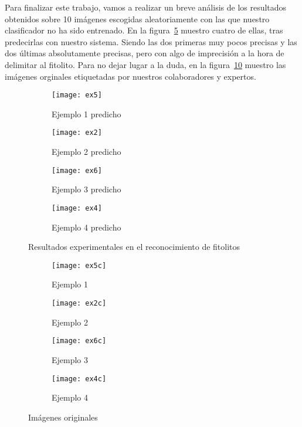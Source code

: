 Para finalizar este trabajo, vamos a realizar un breve análisis de los resultados obtenidos sobre 10 imágenes escogidas aleatoriamente con las que nuestro clasificador no ha sido entrenado. En la figura~\ref{fig:5.17} muestro cuatro de ellas, tras predecirlas con nuestro sistema. Siendo las dos primeras muy pocos precisas y las dos últimas absolutamente precisas, pero con algo de imprecisión a la hora de delimitar al fitolito. Para no dejar lugar a la duda, en la figura~\ref{fig:5.18} muestro las imágenes orginales etiquetadas por nuestros colaboradores y expertos.

\begin{figure}
	\centering
	\begin{subfigure}[b]{0.45\textwidth}
        \texttt{[image: ex5]}
        \caption{Ejemplo 1 predicho}
        \label{subfig:fej1}
    \end{subfigure}
    \begin{subfigure}[b]{0.45\textwidth}
        \texttt{[image: ex2]}
        \caption{Ejemplo 2 predicho}
        \label{subfig:fej2}
    \end{subfigure}
    \begin{subfigure}[b]{0.45\textwidth}
        \texttt{[image: ex6]}
        \caption{Ejemplo 3 predicho}
        \label{subfig:fe3}
    \end{subfigure}
    \begin{subfigure}[b]{0.45\textwidth}
        \texttt{[image: ex4]}
        \caption{Ejemplo 4 predicho}
        \label{subfig:fe4}
    \end{subfigure}
        \caption{Resultados experimentales en el reconocimiento de fitolitos}
	\label{fig:5.17}
\end{figure}

\begin{figure}
	\centering
	\begin{subfigure}[b]{0.45\textwidth}
        \texttt{[image: ex5c]}
        \caption{Ejemplo 1}
        \label{subfig:fej1c}
    \end{subfigure}
    \begin{subfigure}[b]{0.45\textwidth}
        \texttt{[image: ex2c]}
        \caption{Ejemplo 2}
        \label{subfig:fej2c}
    \end{subfigure}
    \begin{subfigure}[b]{0.45\textwidth}
        \texttt{[image: ex6c]}
        \caption{Ejemplo 3}
        \label{subfig:fe3c}
    \end{subfigure}
    \begin{subfigure}[b]{0.45\textwidth}
        \texttt{[image: ex4c]}
        \caption{Ejemplo 4}
        \label{subfig:fe4c}
    \end{subfigure}
        \caption{Imágenes originales}
	\label{fig:5.18}
\end{figure}

